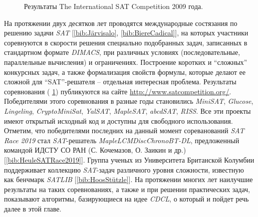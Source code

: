 \begin{figure}[h]
\centering
\captionsetup{justification=centering}
\caption{Результаты The International SAT Competition 2009 года.}
\label{chapter1:fig:satcomp}
\end{figure}

На протяжении двух десятков лет проводятся международные состязания по решению задачи \textit{SAT} 
[\ref{bib:Järvisalo}, \ref{bib:BiereCadical}], на которых участники соревнуются в скорости решения специально подобранных задач, записанных в стандартном формате \textit{DIMACS}, при различных условиях (последовательные, параллельные вычисления) и ограничениях. Построение коротких и \enquote{сложных} конкурсных задач, а также формализация свойств формулы, которые делают ее сложной для \enquote{SAT}-решателя – отдельная интересная проблема. Результаты соревнования 
(\figurename{ \ref{chapter1:fig:satcomp}}) публикуются на сайте \url{http://www.satcompetition.org/}. Победителями этого соревнования в разные годы становились \textit{MiniSAT}, \textit{Glucose}, \textit{Lingeling}, \textit{CryptoMiniSat}, \textit{YalSAT}, \textit{MapleSAT}, \textit{abcdSAT}, \textit{RISS}. Все эти проекты имеют открытый исходный код и доступны для свободного использования. Отметим, что победителями последних на данный момент сореванований \textit{SAT Race 2019} стал \textit{SAT}-решатель \textit{MapleLCMDiscChronoBT-DL}, предложенный
командой ИДСТУ СО РАН (С. Кочемазов, О. Заикин и др.) [\ref{bib:HeuleSATRace2019}]. 
Группа ученых из Университета Британской Колумбии поддерживает коллекцию \textit{SAT}-задач различного уровня сложности, известную как бенчмарк \textit{SATLIB} 
[\ref{bib:HoosStützle}]. На протяжении многих лет наилучшие результаты на таких соревнованиях, а также и при решении практических задач, показывают алгоритмы, базирующиеся на идее \textit{CDCL}, о который и пойдет речь далее в этой главе.

